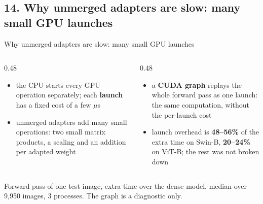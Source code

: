 \documentclass[aspectratio=169,11pt]{beamer}
\newcommand{\figH}{5.0cm}
\newcommand{\src}[1]{\par\vfill{\tiny\color{cGrey}#1\par}}
\begin{document}
\subsection{14. Why unmerged adapters are slow: many small GPU launches}
\begin{frame}{Why unmerged adapters are slow: many small GPU launches}
\vspace{-1mm}
{\renewcommand{\figH}{4.0cm}\centering\par}
\vspace{-1mm}
\begin{columns}[T]
\begin{column}{0.48\textwidth}
\footnotesize
\begin{itemize}
  \item the CPU starts every GPU operation separately; each \textbf{launch} has a fixed cost of a few $\mu$s
  \item unmerged adapters add many small operations: two small matrix products, a scaling and an addition per adapted weight
\end{itemize}
\end{column}
\begin{column}{0.48\textwidth}
\footnotesize
\begin{itemize}
  \item a \textbf{CUDA graph} replays the whole forward pass as one launch: the same computation, without the per-launch cost
  \item launch overhead is \textbf{48--56\%} of the extra time on Swin-B, \textbf{20--24\%} on ViT-B; the rest was not broken down
\end{itemize}
\end{column}
\end{columns}
\src{Forward pass of one test image, extra time over the dense model, median over 9,950 images, 3 processes. The graph is a diagnostic only.}
\end{frame}

\end{document}
